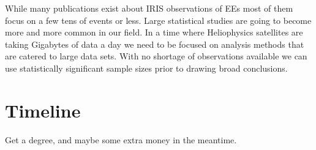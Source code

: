 \documentclass[]{aastex6}
\begin{document}
While many publications exist about IRIS observations of EEs most of them focus on a few tens of events or less. Large statistical studies are going to become more and more common in our field.  In a time where Heliophysics satellites are taking Gigabytes of data a day we need to be focused on analysis methods that are catered to large data sets.  With no shortage of observations available we can use statistically significant sample sizes prior to drawing broad conclusions. 

 
\section{Timeline}
Get a  degree, and maybe some extra money in the meantime.





	
\end{document}
